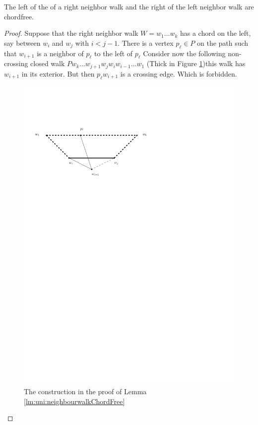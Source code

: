     \begin{lemma}
      \label{lm:uni:neighbourwalkChordFree}
      The left of the of a right neighbor walk and the right of the left neighbor walk are chordfree.
    \end{lemma}
    \begin{proof}
      Suppose that the right neighbor walk $W = w_1 \ldots w_k$  has a chord on the left, say between $w_i$ and $w_j$ with $i< j -1 $. There is a vertex $p_\ell \in P$ on the path such that $w_{i+1}$ is a neighbor of $p_\ell$ to the left of $p_\ell$ Consider now the following non-crossing closed walk $P w_k \ldots w_{j+1} w_j w_i w_{i-1} \ldots w_1$
      (Thick in Figure \ref{fig:uni:neihbourwalkChordFree})this walk has $w_{i+1}$ in its exterior. But then $p_\ell w_{i+1}$ is a crossing edge. Which is forbidden.

      \begin{figure}[h]
        \centering
        \includegraphics[scale=1]{unifiedAlgo/img/neighbourWalkChords}
        \caption{The construction in the proof of Lemma \ref{lm:uni:neighbourwalkChordFree}}
        \label{fig:uni:neihbourwalkChordFree}
      \end{figure}
    \end{proof}


